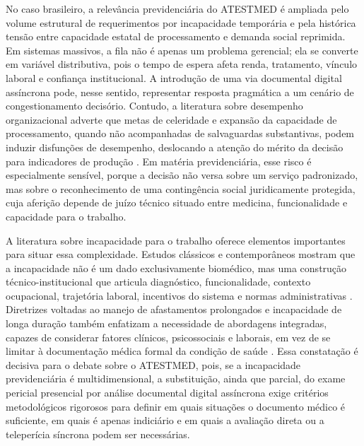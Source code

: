 \documentclass[12pt,a4paper]{article}
\begin{document}
No caso brasileiro, a relevância previdenciária do ATESTMED é ampliada pelo volume estrutural de requerimentos por incapacidade temporária e pela histórica tensão entre capacidade estatal de processamento e demanda social reprimida. Em sistemas massivos, a fila não é apenas um problema gerencial; ela se converte em variável distributiva, pois o tempo de espera afeta renda, tratamento, vínculo laboral e confiança institucional. A introdução de uma via documental digital assíncrona pode, nesse sentido, representar resposta pragmática a um cenário de congestionamento decisório. Contudo, a literatura sobre desempenho organizacional adverte que metas de celeridade e expansão da capacidade de processamento, quando não acompanhadas de salvaguardas substantivas, podem induzir disfunções de desempenho, deslocando a atenção do mérito da decisão para indicadores de produção \parencite{kelman2009performanceimprovementandperformancedysfunctionanemp}. Em matéria previdenciária, esse risco é especialmente sensível, porque a decisão não versa sobre um serviço padronizado, mas sobre o reconhecimento de uma contingência social juridicamente protegida, cuja aferição depende de juízo técnico situado entre medicina, funcionalidade e capacidade para o trabalho.

A literatura sobre incapacidade para o trabalho oferece elementos importantes para situar essa complexidade. Estudos clássicos e contemporâneos mostram que a incapacidade não é um dado exclusivamente biomédico, mas uma construção técnico-institucional que articula diagnóstico, funcionalidade, contexto ocupacional, trajetória laboral, incentivos do sistema e normas administrativas \parencite{dijkstrasdatamakingupincapacityforwork, sainsbury2006routesontoincapacitybenefitsfindingsfromqualitati, corden2001incapacitybenefitsandworkincentives}. Diretrizes voltadas ao manejo de afastamentos prolongados e incapacidade de longa duração também enfatizam a necessidade de abordagens integradas, capazes de considerar fatores clínicos, psicossociais e laborais, em vez de se limitar à documentação médica formal da condição de saúde \parencite{gabbay2011niceguidanceonlongtermsicknessandincapacity}. Essa constatação é decisiva para o debate sobre o ATESTMED, pois, se a incapacidade previdenciária é multidimensional, a substituição, ainda que parcial, do exame pericial presencial por análise documental digital assíncrona exige critérios metodológicos rigorosos para definir em quais situações o documento médico é suficiente, em quais é apenas indiciário e em quais a avaliação direta ou a teleperícia síncrona podem ser necessárias.
\end{document}
